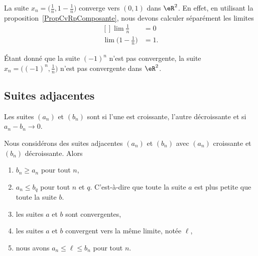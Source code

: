 \begin{example}
	La suite \( x_n=\big( \frac{1}{ n },1-\frac{1}{ n } \big)\) converge vers \( (0,1)\) dans \( \eR^2\). En effet, en utilisant la proposition~\ref{PropCvRpComposante}, nous devons calculer séparément les limites
	\begin{equation}
		\begin{aligned}[]
			\lim\frac{1}{ n }               & =0  \\
			\lim\big( 1-\frac{1}{ n } \big) & =1.
		\end{aligned}
	\end{equation}
\end{example}

\begin{example}
	Étant donné que la suite \( (-1)^n\) n'est pas convergente, la suite \( x_n=\big( (-1)^n,\frac{1}{ n } \big)\) n'est pas convergente dans \( \eR^2\).
\end{example}

\subsection{Suites adjacentes}

\begin{definition}         \label{DEFooDMZLooDtNPmu}
	Les suites \( (a_n)\) et \( (b_n)\) sont  si l'une est croissante, l'autre décroissante et si \( a_n-b_n\to 0\).
\end{definition}

\begin{theorem}   \label{THOooZJWLooAtGMxD}
	Nous considérons des suites adjacentes \( (a_n)\) et \( (b_n)\) avec \( (a_n)\) croissante et \( (b_n)\) décroissante. Alors
	\begin{enumerate}
		\item
		      \( b_n\geq a_n\) pour tout \( n\),
		\item
		      \( a_n\leq b_q\) pour tout \( n\) et \( q\). C'est-à-dire que toute la suite \( a\) est plus petite que toute la suite \( b\).
		\item
		      les suites \( a\) et \( b\) sont convergentes,
		\item
		      les suites \( a\) et \( b\) convergent vers la même limite, notée \( \ell\),
		\item
		      nous avons \( a_n\leq \ell\leq b_n\) pour tout \( n\).
	\end{enumerate}
\end{theorem}

